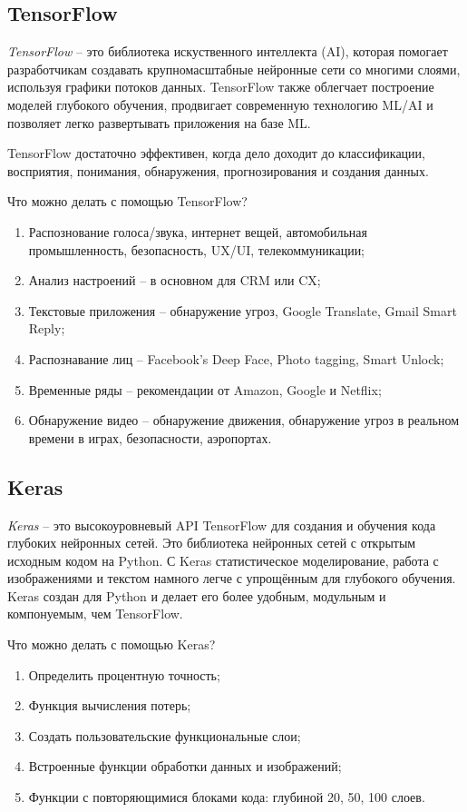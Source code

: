\subsection{TensorFlow}

\textit{TensorFlow} -- это библиотека искуственного интеллекта (AI), которая помогает разработчикам создавать крупномасштабные нейронные сети со многими слоями, используя графики потоков данных. TensorFlow также облегчает построение моделей глубокого обучения, продвигает современную технологию ML/AI и позволяет легко развертывать приложения на базе ML.

TensorFlow достаточно эффективен, когда дело доходит до классификации, восприятия, понимания, обнаружения, прогнозирования и создания данных.

Что можно делать с помощью TensorFlow?

\begin{enumerate}
	\item Распознование голоса/звука, интернет вещей, автомобильная промышленность, безопасность, UX/UI, телекоммуникации;
	\item Анализ настроений -- в основном для CRM или CX;
	\item Текстовые приложения -- обнаружение угроз, Google Translate, Gmail Smart Reply;
	\item Распознавание лиц -- Facebook's Deep Face, Photo tagging, Smart Unlock;
	\item Временные ряды -- рекомендации от Amazon, Google и Netflix;
	\item Обнаружение видео -- обнаружение движения, обнаружение угроз в реальном времени в играх, безопасности, аэропортах.
\end{enumerate}

\subsection{Keras}

\textit{Keras} -- это высокоуровневый API TensorFlow для создания и обучения кода глубоких нейронных сетей. Это библиотека нейронных сетей с открытым исходным кодом на Python. С Keras статистическое моделирование, работа с изображениями и текстом намного легче с упрощённым для глубокого обучения. Keras создан для Python и делает его более удобным, модульным и компонуемым, чем TensorFlow.

Что можно делать с помощью Keras?

\begin{enumerate}
	\item Определить процентную точность;
	\item Функция вычисления потерь;
	\item Создать пользовательские функциональные слои;
	\item Встроенные функции обработки данных и изображений;
	\item Функции с повторяющимися блоками кода: глубиной 20, 50, 100 слоев.
\end{enumerate}

